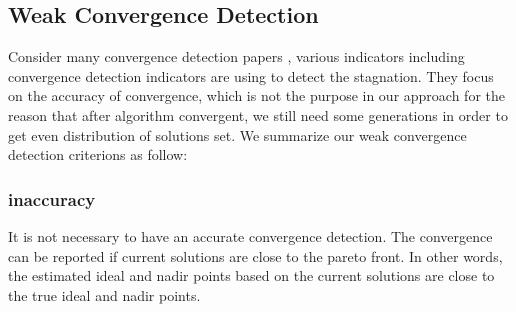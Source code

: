 \documentclass[conference]{IEEEtran}
\begin{document}
%
%
%
\subsection{Weak Convergence Detection}
Consider many convergence detection papers 
\cite{convergenceDetection:1, convergenceDetection:LSSC, convergenceDetection:OCD, 
convergenceDetection:OFCDandOCD, convergenceDetection:convergenceMetric, convergenceDetection:maxCD, 
convergenceDetection:online},
various indicators including convergence detection indicators are using to detect the stagnation.
They focus on the accuracy of convergence, which is not the purpose in our approach for 
the reason that after algorithm convergent, we still need some generations in order to
get even distribution of solutions set. 
We summarize our weak convergence detection criterions as follow:
\subsubsection{inaccuracy} It is not necessary to have an accurate convergence detection. 
The convergence can be reported if current solutions are close to the pareto front.
In other words, the estimated ideal and nadir points based on the current solutions
are close to the true ideal and nadir points. 
\end{document}
